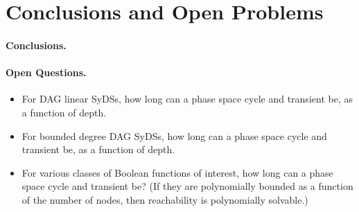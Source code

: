 \section{Conclusions and Open Problems}
\label{sec:concl}

\noindent
\paragraph{Conclusions.}


\paragraph{Open Questions.}

\begin{itemize}
\item For DAG linear SyDSs, how long can a phase space cycle and transient be,
as a function of depth.

\item For bounded degree DAG  SyDSs, how long can a phase space cycle and transient be,
as a function of depth.

\item For various classes of Boolean functions of interest, 
how long can a phase space cycle and transient be?
(If they are polynomially bounded as a function of the number of nodes,
then reachability is polynomially solvable.)
\end{itemize}
